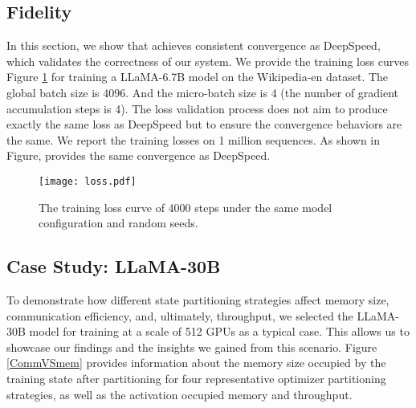 


\subsection{Fidelity}
\label{sec:fidelity}

In this section, we show that \SysName achieves consistent convergence as DeepSpeed, which validates the correctness of our system. 
We provide the training loss curves Figure \ref{loss} for training a LLaMA-6.7B  model on the Wikipedia-en dataset. The global batch size is 4096. And the micro-batch size is 4 (the number of gradient accumulation steps is 4). The loss validation process does not aim to produce exactly the same loss as DeepSpeed but to ensure the convergence behaviors are the same. We report the training losses on 1 million sequences. As shown in Figure, \SysName provides the same convergence as DeepSpeed.

\begin{figure}[t]
    \centering
    \texttt{[image: loss.pdf]}
    \caption{The training loss curve of 4000 steps under the same model  configuration and random seeds.}
    \label{loss}
\end{figure}


\subsection{Case Study: LLaMA-30B}
\label{sec:case-study}
To demonstrate how different state partitioning strategies affect memory size, communication efficiency, and, ultimately, throughput, we selected the LLaMA-30B model for training at a scale of 512 GPUs as a typical case. This allows us to showcase our findings and the insights we gained from this scenario. Figure \ref{CommVSmem} provides information about the memory size occupied by the training state after partitioning for four representative optimizer partitioning strategies, as well as the activation occupied memory and throughput.

